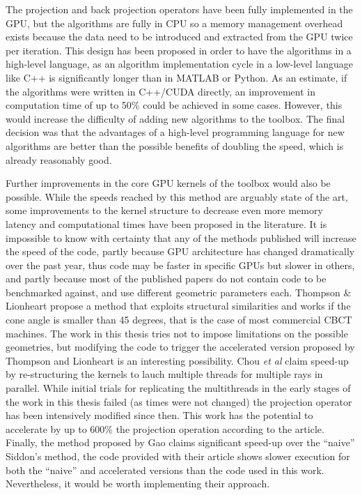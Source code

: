 The projection and back projection operators have been fully implemented in the GPU, but the algorithms are fully in CPU so a memory management overhead exists because the data need to be introduced and extracted from the GPU twice per iteration. This design has been proposed in order to have the algorithms in a high-level language, as an algorithm implementation cycle in a low-level language like C++ is significantly longer than in MATLAB or Python. As an estimate, if the algorithms were written in C++/CUDA directly, an improvement in computation time of up to 50\% could be achieved in some cases. However, this would increase the difficulty of adding new algorithms to the toolbox. The final decision was that the advantages of a high-level programming language for new algorithms are better than the possible benefits of doubling the speed, which is already reasonably good. 

Further improvements in the core GPU kernels of the toolbox would also be possible. While the speeds reached by this method are arguably state of the art, some improvements to the kernel structure to decrease even more memory latency and computational times have been proposed in the literature. It is impossible to know with certainty that any of the methods published will increase the speed of the code, partly because GPU architecture has changed dramatically over the past year, thus code may be faster in specific GPUs but slower in others, and partly because most of the published papers do not contain code to be benchmarked against, and use different geometric parameters each. Thompson \& Lionheart\cite{thompson2014gpu} propose a method that exploits structural similarities and works if the cone angle is smaller than 45 degrees, that is the case of most commercial CBCT machines. The work in this thesis tries not to impose limitations on the possible geometries, but modifying the code to trigger the accelerated version proposed by Thompson and Lionheart is an interesting possibility. Chou \emph{et al}\cite{chou2011fast} claim speed-up by re-structuring the kernels to lauch multiple threads for multiple rays in parallel. While initial trials for replicating the multithreads in the early stages of the work in this thesis failed (as times were not changed) the projection operator has  been intensively modified since then. This work has the potential to accelerate by up to 600\% the projection operation according to the article. Finally, the method proposed by Gao\cite{gao2012fast} claims significant speed-up over the ``naive'' Siddon's method, the code provided with their article shows slower execution for both the ``naive'' and accelerated versions than the code used in this work. Nevertheless, it would be worth implementing their approach.

